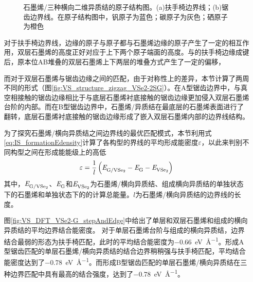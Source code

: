 \begin{figure}[htb]
{            \label{fig:VS_structure_zigzag_VSe2-2SG}
        }
        \caption{石墨烯/三种横向二维异质结的原子结构图。(a)扶手椅边界线；(b)锯齿边界线。在原子结构图中，钒原子为蓝色；碳原子为灰色；硒原子为橙色}
        \label{fig:VS_structure_ac_zz}
    \end{figure}
    
    对于扶手椅边界线，边缘的原子与原子都与石墨烯边缘的原子产生了一定的相互作用，双层石墨烯的高度正好对应于上下两个原子端面的高度。与的扶手椅边缘成键后，原本位AB堆叠的双层石墨烯上下两层的堆叠方式产生了一定的偏移，

    而对于双层石墨烯与锯齿边缘之间的匹配，由于对称性上的差异，本节计算了两周不同的形式（图\ref{fig:VS_structure_zigzag_VSe2-2SG}）。在A型锯齿边界中，与真空相接触的锯齿边缘相比于与底层石墨烯衬底接触的锯齿边缘更加侵入双层石墨烯台阶的内部。而在B型锯齿边界中，石墨烯/异质结在最底层的石墨烯表面进行了翻转，底层石墨烯衬底接触的锯齿边缘形成了嵌入双层石墨烯内部的边界线结构。

    为了探究石墨烯/横向异质结之间边界线的最优匹配模式，本节利用式\eqref{eq:IS_formationEdensity}计算了各构型的界线的平均形成能密度$\varepsilon$，以此来判别不同构型之间在形成能能级上的高低\chinesecolon
    \begin{equation}
        \label{eq:IS_formationEdensity}
        \varepsilon = \frac{1}{l} \left( \energyVar{G/\ce{VSe2}}{} -\energyVar{G}{} -\energyVar{\ce{VSe2}}{} \right)
    \end{equation}
    其中，$\energyVar{G/\ce{VSe2}}{}$、$\it E_{\rm G}^{\rm } \it$和$\energyVar{\ce{VSe2}}{}$为石墨烯/横向异质结、组成横向异质结的单独状态下的石墨烯和单独状态下的的计算总能量。$l$为石墨烯/横向异质结的边界线的长度。
    
    图\ref{fig:VS_DFT_VSe2-G_stepAndEdge}中给出了单层和双层石墨烯和组成的横向异质结的平均边界结合能密度。
    对于单层石墨烯台阶与组成的横向异质结，边界结合最弱的形态为扶手椅匹配，此时的平均结合能密度为\SI{-0.66}{\electronvolt\per\angstrom}。形成A型锯齿匹配的单层石墨烯/横向异质结的结合边界稍稍强与扶手椅匹配，平均结合能密度达到了\SI{-0.78}{\electronvolt\per\angstrom}。而形成B型锯齿匹配的单层石墨烯/横向异质结在三种边界匹配中具有最高的结合强度，达到了\SI{-0.78}{\electronvolt\per\angstrom}。

